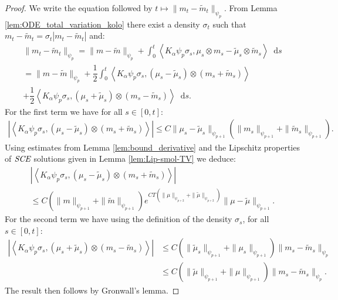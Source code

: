 \documentclass[11pt,a4paper]{article}
\newcommand{\SCE}{\emph{SCE}}
\newcommand{\brac}[1]{\left\langle#1\right\rangle}
\newcommand{\dd}{\mathop{}\!\mathrm{d}}
\begin{document}
\begin{proof}
    We write the equation followed by $t \mapsto \| m_t - \tilde{m}_t \|_{\psi_p}$. From Lemma \ref{lem:ODE_total_variation_kolo} there exist a density $\sigma_t$ such that $m_t - \tilde{m}_t = \sigma_t|m_t - \tilde{m}_t|$ and:
    \begin{multline*}
        \| m_t - \tilde{m}_t \|_{\psi_p} = \|m-\tilde{m} \|_{\psi_{p}} + \int_0^t \brac{K_\alpha\psi_p\sigma_s, \mu_s\otimes m_s - \tilde{\mu}_s\otimes \tilde{m}_s} \dd s \\
        = \|m-\tilde{m} \|_{\psi_{p}} + \dfrac12\int_0^t \brac{K_\alpha\psi_p\sigma_s, (\mu_s - \tilde{\mu}_s)\otimes (m_s + \tilde{m}_s) } \\
        + \dfrac12\brac{K_\alpha\psi_p\sigma_s, (\mu_s + \tilde{\mu}_s)\otimes (m_s - \tilde{m}_s)} \dd s.
    \end{multline*}
    For the first term we have for all $s \in [0,t]$:
    \begin{align*}
        \left| \brac{K_\alpha\psi_p\sigma_s, (\mu_s - \tilde{\mu}_s)\otimes (m_s + \tilde{m}_s)}\right| \leq C\| \mu_s - \tilde{\mu}_s\|_{\psi_{p+1}} \left(\| m_s\|_{\psi_{p+1}} + \| \tilde{m}_s\|_{\psi_{p+1}}\right).
    \end{align*}
    Using estimates from Lemma \ref{lem:bound_derivative} and the Lipschitz properties of $\SCE$ solutions given in Lemma \ref{lem:Lip-smol-TV} we deduce:
    \begin{multline*}
        \left| \brac{K_\alpha\psi_p\sigma_s, (\mu_s - \tilde{\mu}_s)\otimes (m_s + \tilde{m}_s) }\right| \\
        \leq C(\|m\|_{\psi_{p+1}}+ \|\tilde{m}\|_{\psi_{p+1}})e^{CT\left(\|\mu\|_{\psi_{p +2}} + \|\tilde{\mu}\|_{\psi_{p +2}}\right)} \|\mu - \tilde{\mu}\|_{\psi_{p+1}}.
    \end{multline*}
    For the second term we have using the definition of the density $\sigma_s$, for all $s \in [0,t]$:
    \begin{align*}
        \left| \brac{K_\alpha\psi_p\sigma_s, (\mu_s + \tilde{\mu}_s)\otimes (m_s - \tilde{m}_s)} \right| 
        &\leq C \left(\| \tilde{\mu}_s\|_{\psi_{p+1}} + \| \mu_s\|_{\psi_{p+1}}\right)\|m_s - \tilde{m}_s \|_{\psi_p} \\
        &\leq C \left(\| \tilde{\mu}\|_{\psi_{p+1}} + \| \mu\|_{\psi_{p+1}}\right)\|m_s - \tilde{m}_s \|_{\psi_p}.
    \end{align*}
    The result then follows by Gronwall's lemma.
\end{proof}
\end{document}

